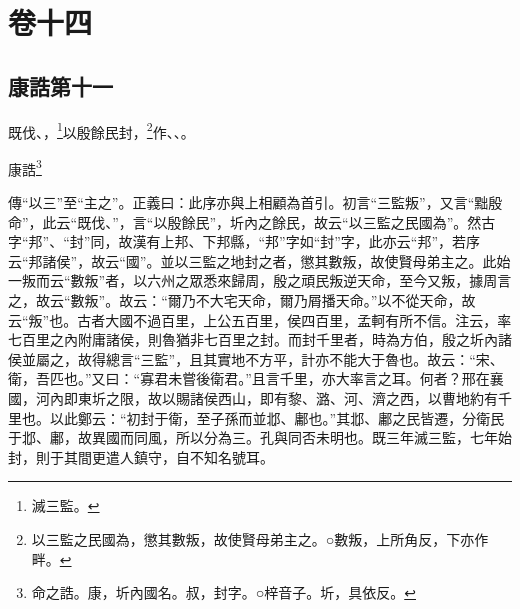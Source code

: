 

\chapter{卷十四}


\section{康誥第十一}


既伐、，\footnote{滅三監。}以殷餘民封，\footnote{以三監之民國為，懲其數叛，故使賢母弟主之。○數叛，上所角反，下亦作畔。}作、、。

康誥\footnote{命之誥。康，圻內國名。叔，封字。○梓音子。圻，具依反。}


{\noindent\zhuan{}\fzbyks 傳“以三”至“主之”。正義曰：此序亦與上相顧為首引。初言“三監叛”，又言“黜殷命”，此云“既伐、”，言“以殷餘民”，圻內之餘民，故云“以三監之民國為”。然古字“邦”、“封”同，故漢有上邦、下邦縣，“邦”字如“封”字，此亦云“邦”，若序云“邦諸侯”，故云“國”。並以三監之地封之者，懲其數叛，故使賢母弟主之。此始一叛而云“數叛”者，以六州之眾悉來歸周，殷之頑民叛逆天命，至今又叛，據周言之，故云“數叛”。故云：“爾乃不大宅天命，爾乃屑播天命。”以不從天命，故云“叛”也。古者大國不過百里，上公五百里，侯四百里，孟軻有所不信。注云，率七百里之內附庸諸侯，則魯猶非七百里之封。而封千里者，時為方伯，殷之圻內諸侯並屬之，故得總言“三監”，且其實地不方平，計亦不能大于魯也。故云：“宋、衛，吾匹也。”又曰：“寡君未嘗後衛君。”且言千里，亦大率言之耳。何者？邢在襄國，河內即東圻之限，故以賜諸侯西山，即有黎、潞、河、濟之西，以曹地約有千里也。以此鄭云：“初封于衛，至子孫而並邶、鄘也。”其邶、鄘之民皆遷，分衛民于邶、鄘，故異國而同風，所以分為三。孔與同否未明也。既三年滅三監，七年始封，則于其間更遣人鎮守，自不知名號耳。 \par}

